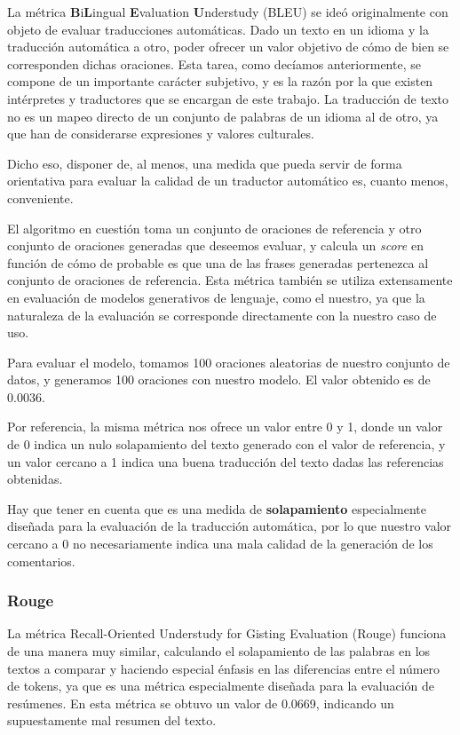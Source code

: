 La métrica \textbf{B}i\textbf{L}ingual \textbf{E}valuation \textbf{U}nderstudy (BLEU) se ideó originalmente con objeto de evaluar traducciones automáticas. Dado un texto en un idioma y la traducción automática a otro, poder ofrecer un valor objetivo de cómo de bien se corresponden dichas oraciones. Esta tarea, como decíamos anteriormente, se compone de un importante carácter subjetivo, y es la razón por la que existen intérpretes y traductores que se encargan de este trabajo. La traducción de texto no es un mapeo directo de un conjunto de palabras de un idioma al de otro, ya que han de considerarse expresiones y valores culturales.

Dicho eso, disponer de, al menos, una medida que pueda servir de forma orientativa para evaluar la calidad de un traductor automático es, cuanto menos, conveniente.

El algoritmo en cuestión toma un conjunto de oraciones de referencia y otro conjunto de oraciones generadas que deseemos evaluar, y calcula un \textit{score} en función de cómo de probable es que una de las frases generadas pertenezca al conjunto de oraciones de referencia. Esta métrica también se utiliza extensamente en evaluación de modelos generativos de lenguaje, como el nuestro, ya que la naturaleza de la evaluación se corresponde directamente con la nuestro caso de uso.


Para evaluar el modelo, tomamos 100 oraciones aleatorias de nuestro conjunto de datos, y generamos 100 oraciones con nuestro modelo. El valor obtenido es de 0.0036. 

Por referencia, la misma métrica nos ofrece un valor entre 0 y 1, donde un valor de 0 indica un nulo solapamiento del texto generado con el valor de referencia, y un valor cercano a 1 indica una buena traducción del texto dadas las referencias obtenidas.

Hay que tener en cuenta que es una medida de \textbf{solapamiento} especialmente diseñada para la evaluación de la traducción automática, por lo que nuestro valor cercano a 0 no necesariamente indica una mala calidad de la generación de los comentarios.

\subsubsection{Rouge}
La métrica Recall-Oriented Understudy for Gisting Evaluation (Rouge) funciona de una manera muy similar, calculando el solapamiento de las palabras en los textos a comparar y haciendo especial énfasis en las diferencias entre el número de tokens, ya que es una métrica especialmente diseñada para la evaluación de resúmenes. En esta métrica se obtuvo un valor de 0.0669, indicando un supuestamente mal resumen del texto. 

